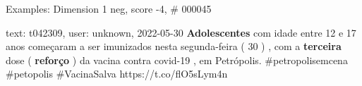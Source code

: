 \begin{frame}{Examples: Dimension 1 neg, score -4, \# 000045}
\footnotesize
\begin{alertblock}{text: t042309, user: unknown, 2022-05-30}
\textbf{Adolescentes} com idade entre 12 e 17 anos começaram a ser imunizados 
nesta segunda-feira ( 30 ) , com a \textbf{terceira} dose ( \textbf{reforço} ) 
da vacina contra covid-19 , em Petrópolis. \#petropolisemcena \#petopolis 
\#VacinaSalva https://t.co/flO5sLym4n 
\end{alertblock}
\end{frame}
